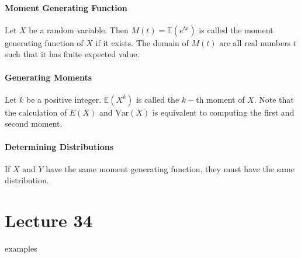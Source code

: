 \documentclass[10pt,letter]{article}
\begin{document}
\paragraph{Moment Generating Function}
Let $X$ be a random variable. Then $M(t)=\mathbb{E}(e^{tx})$ is called the moment generating function of $X$ if it exists. The domain of $M(t)$ are all real numbers $t$ such that it has finite expected value. 

\paragraph{Generating Moments}
Let $k$ be a positive integer. $\mathbb{E}(X^k)$ is called the $k-$th moment of $X$. Note that the calculation of $E(X)$ and $\text{Var}(X)$ is equivalent to computing the first and second moment. 

\paragraph{Determining Distributions}
If $X$ and $Y$ have the same moment generating function, they must have the same distribution. 


\section*{Lecture 34}
examples
\end{document}
